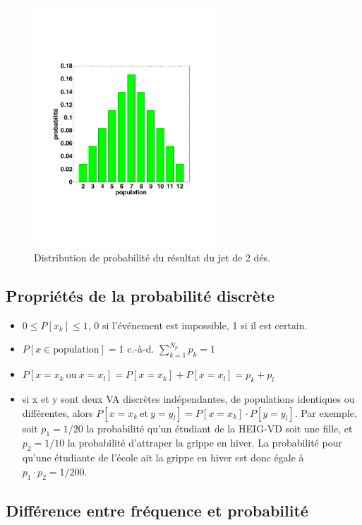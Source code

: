 \begin{figure}[h]
    \centering
    \includegraphics[width=7cm]{assets/figures/Serie2_exe01fig1.pdf}
    \caption{Distribution de probabilité du résultat du jet de 2 dés.}
    \label{fig:ddjddd}
\end{figure}

\subsection{Propriétés de la probabilité discrète}

\begin{itemize}
    \item $0\le P[x_k]\le 1$, 0 si l'événement est impossible, 1 si il est certain.
    \item $P[x\in\text{population}]=1$ c.-à-d. $\sum_{k=1}^{N_p} p_k=1$
    \item $P[x=x_k\ \text{ou}\ x=x_l]=P[x=x_k]+P[x=x_l]=p_k+p_l$
    \item si x et y sont deux VA discrètes indépendantes, de populations identiques ou différentes, alors $P[x=x_k\ \text{et}\ y=y_l]=P[x=x_k]\cdot P[y=y_l]$. Par exemple, soit $p_1=1/20$ la probabilité qu'un étudiant de la HEIG-VD soit une fille, et $p_2=1/10$ la probabilité d'attraper la grippe en hiver. La probabilité pour qu'une étudiante de l'école ait la grippe en hiver est donc égale à $p_1\cdot p_2=1/200$.
\end{itemize}

\subsection{Différence entre fréquence et probabilité}

